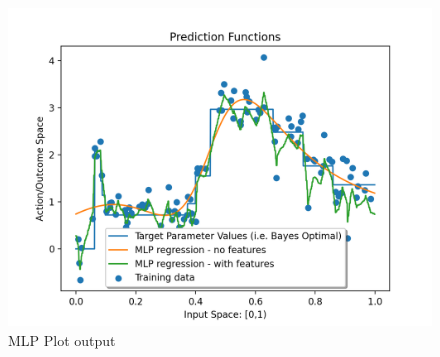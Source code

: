 \documentclass{article}
\theoremstyle{plain}
\theoremstyle{definition}
\begin{document}
\begin{enumerate}
\begin{figure}[h!]
    \centering
    \includegraphics[scale=.7]{MLP Plot output.png}
    \caption{MLP Plot output}
    \label{fig:MLP Plot output}
\end{figure}


\end{enumerate}
\end{document}
